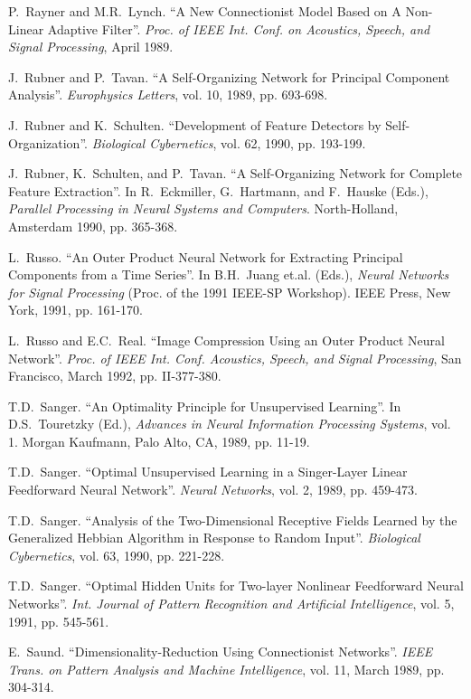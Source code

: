 \begin{thebibliography}{999}
P.~Rayner and M.R.~Lynch.
``A New Connectionist Model Based on A Non-Linear Adaptive Filter''.
{\em Proc. of IEEE Int. Conf. on Acoustics, Speech, and Signal
Processing}, April 1989.
 
J.~Rubner and P.~Tavan.
``A Self-Organizing Network for Principal Component Analysis''.
{\em Europhysics Letters}, vol. 10, 1989, pp. 693-698.

J.~Rubner and K.~Schulten.
``Development of Feature Detectors by Self-Organization''.
{\em Biological Cybernetics}, vol. 62, 1990, pp. 193-199.

J.~Rubner, K.~Schulten, and P.~Tavan.
``A Self-Organizing Network for Complete Feature Extraction''.
In R.~Eckmiller, G.~Hartmann, and F.~Hauske (Eds.), {\em Parallel
Processing in Neural Systems and Computers}. North-Holland, Amsterdam
1990, pp. 365-368.

L.~Russo.
``An Outer Product Neural Network for Extracting Principal 
Components from a Time Series''. 
In B.H.~Juang et.al. (Eds.), {\em Neural Networks for Signal 
Processing} (Proc. of the 1991 IEEE-SP Workshop). IEEE Press, New York,
1991, pp. 161-170.

L.~Russo and E.C.~Real. 
``Image Compression Using an Outer Product Neural Network''.
{\em Proc. of IEEE Int. Conf. Acoustics, Speech, and Signal Processing},
San Francisco, March 1992, pp. II-377-380.

T.D.~Sanger.
``An Optimality Principle for Unsupervised Learning''.
In D.S.~Touretzky (Ed.), {\em Advances in Neural Information
Processing Systems}, vol. 1. Morgan Kaufmann, Palo Alto, CA, 1989, pp. 11-19.
 
T.D.~Sanger.
``Optimal Unsupervised Learning in a Singer-Layer Linear Feedforward
Neural Network''.
{\em Neural Networks}, vol. 2, 1989, pp. 459-473.

T.D.~Sanger. 
``Analysis of the Two-Dimensional Receptive Fields Learned by
the Generalized Hebbian Algorithm in Response to Random Input''.
{\em Biological Cybernetics}, vol. 63, 1990, pp. 221-228.

T.D.~Sanger.
``Optimal Hidden Units for Two-layer Nonlinear Feedforward
Neural Networks''.
{\em Int. Journal of Pattern Recognition and Artificial Intelligence},
vol. 5, 1991, pp. 545-561.

E.~Saund.
``Dimensionality-Reduction Using Connectionist Networks''.
{\em IEEE Trans. on Pattern Analysis and Machine Intelligence}, vol. 11,
March 1989, pp. 304-314.
 

\end{thebibliography}
